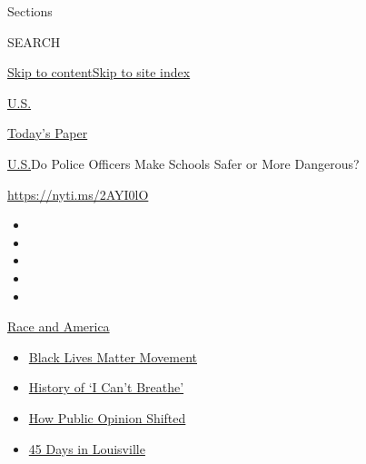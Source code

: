 Sections

SEARCH

\protect\hyperlink{site-content}{Skip to
content}\protect\hyperlink{site-index}{Skip to site index}

\href{https://www.nytimes3xbfgragh.onion/section/us}{U.S.}

\href{https://myaccount.nytimes3xbfgragh.onion/auth/login?response_type=cookie\&client_id=vi}{}

\href{https://www.nytimes3xbfgragh.onion/section/todayspaper}{Today's
Paper}

\href{/section/us}{U.S.}\textbar{}Do Police Officers Make Schools Safer
or More Dangerous?

\url{https://nyti.ms/2AYI0lO}

\begin{itemize}
\item
\item
\item
\item
\item
\end{itemize}

\href{https://www.nytimes3xbfgragh.onion/news-event/george-floyd-protests-minneapolis-new-york-los-angeles?action=click\&pgtype=Article\&state=default\&region=TOP_BANNER\&context=storylines_menu}{Race
and America}

\begin{itemize}
\tightlist
\item
  \href{https://www.nytimes3xbfgragh.onion/interactive/2020/07/03/us/george-floyd-protests-crowd-size.html?action=click\&pgtype=Article\&state=default\&region=TOP_BANNER\&context=storylines_menu}{Black
  Lives Matter Movement}
\item
  \href{https://www.nytimes3xbfgragh.onion/interactive/2020/06/28/us/i-cant-breathe-police-arrest.html?action=click\&pgtype=Article\&state=default\&region=TOP_BANNER\&context=storylines_menu}{History
  of `I Can't Breathe'}
\item
  \href{https://www.nytimes3xbfgragh.onion/interactive/2020/06/10/upshot/black-lives-matter-attitudes.html?action=click\&pgtype=Article\&state=default\&region=TOP_BANNER\&context=storylines_menu}{How
  Public Opinion Shifted}
\item
  \href{https://www.nytimes3xbfgragh.onion/interactive/2020/07/16/us/black-lives-matter-protests-louisville-breonna-taylor.html?action=click\&pgtype=Article\&state=default\&region=TOP_BANNER\&context=storylines_menu}{45
  Days in Louisville}
\end{itemize}

